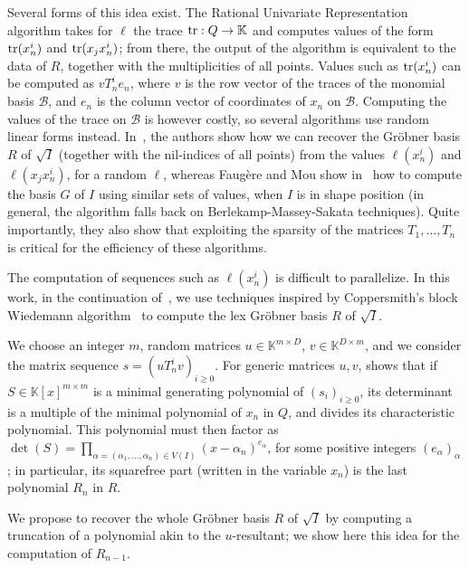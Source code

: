 \documentclass[12pt]{article}
\begin{document}
Several forms of this idea exist. The Rational Univariate
Representation algorithm takes for $\ell$ the trace ${\rm tr}: Q \to
\mathbb{K}$ and computes values of the form ${\rm tr}(x_n^i)$ and
${\rm tr}(x_j x_n^i)$; from there, the output of the algorithm is
equivalent to the data of $R$, together with the multiplicities of all
points. Values such as ${\rm tr}(x_n^i)$ can be computed as $v T_n^i
e_n$, where $v$ is the row vector of the traces of the monomial basis
$\mathscr{B}$, and $e_n$ is the column vector of coordinates of $x_n$ on
$\mathscr{B}$. Computing the values of the trace on $\mathscr{B}$ is
however costly, so several algorithms use random linear forms
instead. In~\cite{BoSaSc03}, the authors show how we can recover the
Gr\"obner basis $R$ of $\sqrt{I}$ (together with the nil-indices of
all points) from the values $\ell(x_n^i)$ and $\ell(x_j x_n^i)$, for a
random $\ell$, whereas Faug\`ere and Mou show in~\cite{FaMo17} how to
compute the basis $G$ of $I$ using similar sets of values, when
$I$ is in shape position (in general, the algorithm falls back on
Berlekamp-Massey-Sakata techniques). Quite importantly, they also
show that exploiting the sparsity of the matrices $T_1,\dots,T_n$
is critical for the efficiency of these algorithms.

The computation of sequences such as $\ell(x_n^i)$ is difficult to
parallelize.  In this work, in the continuation of~\cite{BoSaSc03},
we use techniques inspired by Coppersmith's block Wiedemann
algorithm~\cite{Coppersmith93} to compute the lex Gr\"obner basis $R$ of
$\sqrt{I}$.

\medskip{} We choose an integer $m$, random
matrices $u \in \mathbb{K}^{m \times D}$, $v \in \mathbb{K}^{D \times
  m}$, and we consider the matrix sequence $s = (uT_n^iv)_{i \ge
  0}$. For generic matrices $u, v$, \cite[Theorem 2.12]{KaVi04}
shows that if $S \in \mathbb{K}[x]^{m\times m}$ is a minimal
generating polynomial of $(s_i)_{i \ge 0}$, its determinant is a
multiple of the minimal polynomial of $x_n$ in $Q$, and divides its
characteristic polynomial. This polynomial must then factor as
$\det(S) = \prod_{\alpha=(\alpha_1,\dots,\alpha_n) \in V(I)}
(x-\alpha_n)^{e_\alpha}$, for some positive integers $(e_\alpha)_\alpha$; in
particular, its squarefree part (written in the variable $x_n$) is the last polynomial $R_n$ in $R$.

\medskip{} We propose  to recover the 
whole Gr\"obner basis $R$ of $\sqrt{I}$ by computing a truncation of
a polynomial akin to the $u$-resultant; we show here this idea for the computation
of $R_{n-1}$.
\end{document}

